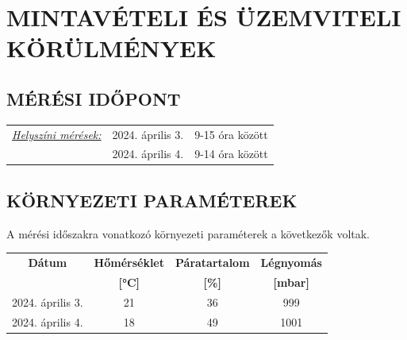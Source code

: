 \documentclass[a4paper,12pt]{article}
\renewcommand{\arraystretch}{0.5}
\begin{document}

	\newpage  %
	\section{MINTAVÉTELI ÉS ÜZEMVITELI KÖRÜLMÉNYEK}
	\subsection{MÉRÉSI IDŐPONT}
		\begin{adjustwidth}{1cm}{0cm}
			\begin{tabular}{ p{5.5cm} p{5cm} p{5cm}} 
				\textit{\underline{Helyszíni mérések:}} & 2024. április 3. 			& 9-15 óra között \\
				& 2024. április 4. 			& 9-14 óra között
			\end{tabular}
			
		\end{adjustwidth}
	
	
	

	\subsection{KÖRNYEZETI PARAMÉTEREK}
		\begin{adjustwidth}{1cm}{0cm}
			A mérési időszakra vonatkozó környezeti paraméterek a következők voltak. \\
			\begin{table}[h]
				\centering
				\renewcommand{\arraystretch}{1.5}
				\begin{tabular}{|c|c|c|c|}
					\hline
					\textbf{Dátum} & \multicolumn{1}{c|}{\textbf{Hőmérséklet}} & \multicolumn{1}{c|}{\textbf{Páratartalom}} & \multicolumn{1}{c|}{\textbf{Légnyomás}} \\ 
					& \textbf{[°C]} & \textbf{[\%]} & \textbf{[mbar]} \\
					
					\hline
					2024. április 3. & 21 & 36 & 999 \\
					\hline
					2024. április 4. & 18 & 49 & 1001 \\
					\hline
				\end{tabular}
			\end{table}
			
			
		\end{adjustwidth}
	
\end{document}
